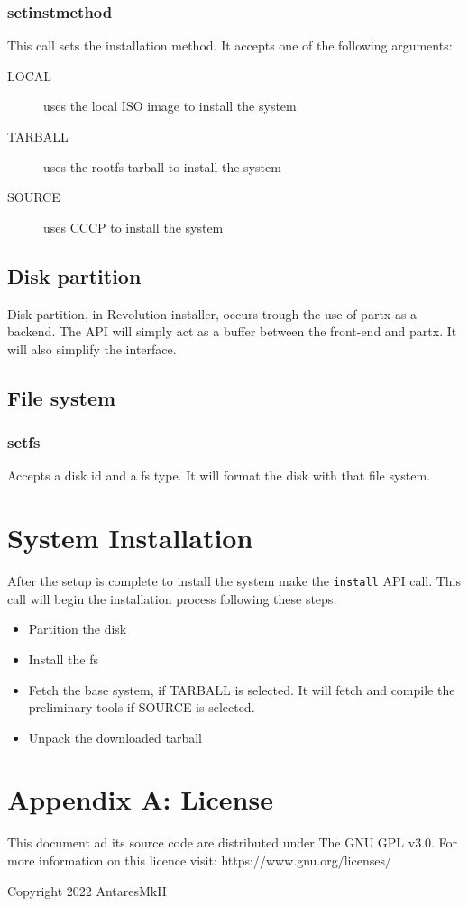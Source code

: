 \documentclass{scrartcl}
\begin{document}
\subsubsection{setinstmethod}
This call sets the installation method. It accepts one of the following
arguments:
\begin{description}
    \item[LOCAL] uses the local ISO image to install the system
    \item[TARBALL] uses the rootfs tarball to install the system
    \item[SOURCE] uses CCCP to install the system
\end{description}

\subsection{Disk partition}
Disk partition, in Revolution-installer, occurs trough the use of partx as a
backend. The API will simply act as a buffer between the front-end and partx.
It will also simplify the interface.

\subsection{File system}
\subsubsection{setfs}
Accepts a disk id and a fs type. It will format the disk with that file system.

\section{System Installation}
After the setup is complete to install the system make the \texttt{install}
API call. This call will begin the installation process following these steps:
\begin{itemize}
    \item Partition the disk
    \item Install the fs
    \item Fetch the base system, if TARBALL is selected. It will fetch and
        compile the preliminary tools if SOURCE is selected.
    \item Unpack the downloaded tarball
\end{itemize}

\section{Appendix A: License}
This document ad its source code are distributed under The GNU GPL v3.0. For
more information on this licence visit: https://www.gnu.org/licenses/

Copyright 2022 AntaresMkII
\end{document}
